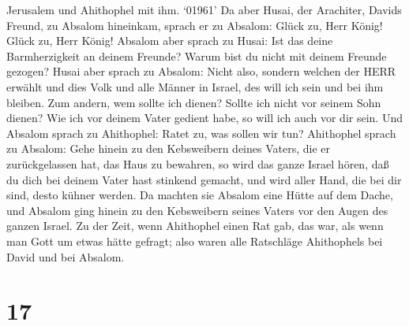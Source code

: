 Jerusalem und Ahithophel mit ihm.  `01961' Da aber Husai,
der Arachiter, Davids Freund, zu Absalom hineinkam, sprach er zu
Absalom: Glück zu, Herr König! Glück zu, Herr König! 
Absalom aber sprach zu Husai: Ist das deine Barmherzigkeit an deinem
Freunde? Warum bist du nicht mit deinem Freunde gezogen? 
Husai aber sprach zu Absalom: Nicht also, sondern welchen der HERR
erwählt und dies Volk und alle Männer in Israel, des will ich sein und
bei ihm bleiben.  Zum andern, wem sollte ich dienen? Sollte
ich nicht vor seinem Sohn dienen? Wie ich vor deinem Vater gedient habe,
so will ich auch vor dir sein.  Und Absalom sprach zu
Ahithophel: Ratet zu, was sollen wir tun?  Ahithophel
sprach zu Absalom: Gehe hinein zu den Kebsweibern deines Vaters, die er
zurückgelassen hat, das Haus zu bewahren, so wird das ganze Israel
hören, daß du dich bei deinem Vater hast stinkend gemacht, und wird
aller Hand, die bei dir sind, desto kühner werden.  Da
machten sie Absalom eine Hütte auf dem Dache, und Absalom ging hinein zu
den Kebsweibern seines Vaters vor den Augen des ganzen Israel.
 Zu der Zeit, wenn Ahithophel einen Rat gab, das war, als
wenn man Gott um etwas hätte gefragt; also waren alle Ratschläge
Ahithophels bei David und bei Absalom.

\hypertarget{section-16}{%
\section{17}\label{section-16}}

